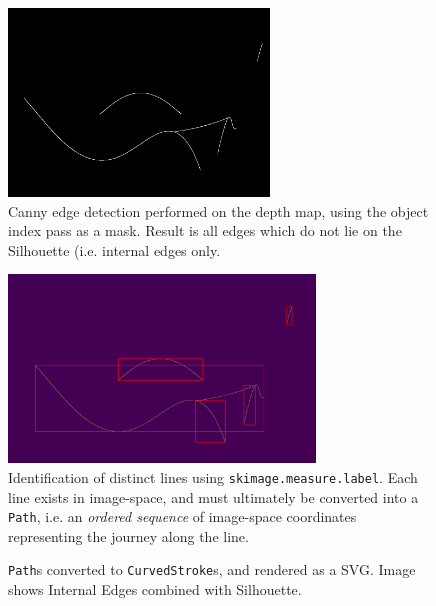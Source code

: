 \begin{figure}[h!]
	\centering
	\includegraphics[height=5cm]{images/int_edge.png}
	\caption{Canny edge detection performed on the depth map, using the object index pass as a mask. Result is all edges which do not lie on the Silhouette (i.e. internal edges only.}\label{int_edge}
\end{figure}

\begin{figure}[h!]
	\centering
	\includegraphics[height=5cm]{images/int_labels.png}
	\caption{Identification of distinct lines using \texttt{skimage.measure.label}. Each line exists in image-space, and must ultimately be converted into a \texttt{Path}, i.e. an \emph{ordered sequence} of image-space coordinates representing the journey along the line.}\label{int_labels}
\end{figure}

\begin{figure}[h!]
	\centering
	
	\caption{\texttt{Path}s converted to \texttt{CurvedStroke}s, and rendered as a SVG. Image shows Internal Edges combined with Silhouette.}\label{int}
\end{figure}

\FloatBarrier

